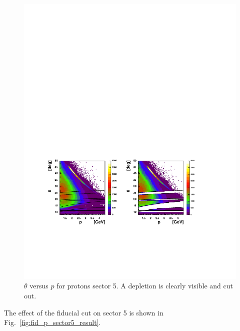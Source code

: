 \begin{figure}[h]
 \begin{center}
 \includegraphics[width = 15cm, bb=20 140 520 380]{img/proton_tp}
  \caption[$\theta$ versus $p$ for protons sector 5]
          { $\theta$ versus $p$ for protons sector 5. A depletion is clearly visible and cut out.}
 \label{fig:proton_tp}
 \end{center}
\end{figure}


The effect of the fiducial cut on sector 5 is shown in Fig.~\ref{fig:fid_p_sector5_result}.


